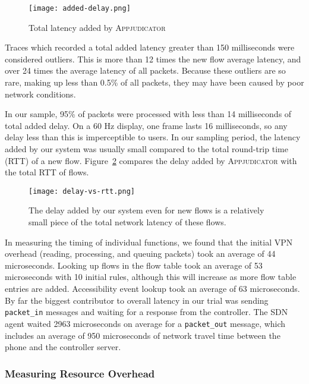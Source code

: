 \begin{figure}[h]
    \centering
	\texttt{[image: added-delay.png]}
	\caption{Total latency added by \textsc{Appjudicator}}
	\label{fig:added-delay-chart}
\end{figure}

Traces which recorded a total added latency greater than 150 milliseconds were
considered outliers. This is more than 12 times the new flow average latency,
and over 24 times the average latency of all packets. Because these outliers are
so rare, making up less than 0.5\% of all packets, they may have been caused by
poor network conditions.

In our sample, 95\% of packets were processed with less than 14 milliseconds of
total added delay. On a 60 Hz display, one frame lasts 16 milliseconds, so any
delay less than this is imperceptible to users. In our sampling period, the
latency added by our system was usually small compared to the total round-trip
time (RTT) of a new flow. Figure~\ref{fig:delay-vs-rtt} compares the delay added
by \textsc{Appjudicator} with the total RTT of flows.

\begin{figure}[h]
    \centering
	\texttt{[image: delay-vs-rtt.png]}
	\caption{The delay added by our system even for new flows is a relatively
		small piece of the total network latency of these flows.}
	\label{fig:delay-vs-rtt}
\end{figure}

In measuring the timing of individual functions, we found that the initial VPN
overhead (reading, processing, and queuing packets) took an average of 44
microseconds. Looking up flows in the flow table took an average of 53
microseconds with 10 initial rules, although this will increase as more flow
table entries are added. Accessibility event lookup took an average of 63
microseconds. By far the biggest contributor to overall latency in our trial was
sending \texttt{packet\_in} messages and waiting for a response from the
controller. The SDN agent waited 2963 microseconds on average for a
\texttt{packet\_out} message, which includes an average of 950 microseconds of
network travel time between the phone and the controller server.

\subsubsection{Measuring Resource Overhead}
\label{sec:measuring-resource-overhead}

